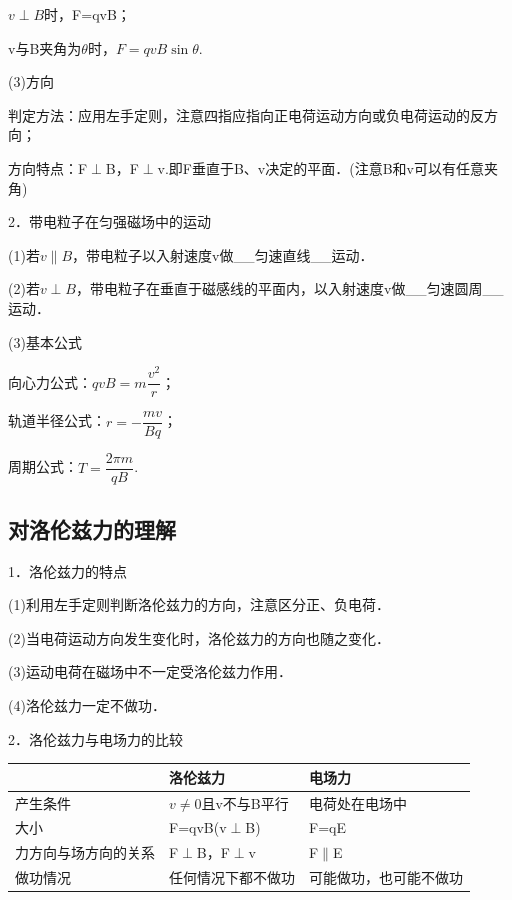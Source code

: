 $v\perp B$时，F=qvB；

v与B夹角为$\theta$时，$F=qvB\sin \theta$.

(3)方向

判定方法：应用左手定则，注意四指应指向正电荷运动方向或负电荷运动的反方向；

方向特点：F$\perp$B，F$\perp$v.即F垂直于B、v决定的平面．(注意B和v可以有任意夹角)

2．带电粒子在匀强磁场中的运动

(1)若$v\parallel B$，带电粒子以入射速度v做\_\_匀速直线\_\_运动．

(2)若$v\perp B$，带电粒子在垂直于磁感线的平面内，以入射速度v做\_\_匀速圆周\_\_运动．

(3)基本公式

向心力公式：$q v B=m \dfrac{v^{2}}{r}$；

轨道半径公式：$r=-\dfrac{m v}{B q}$；

周期公式：$T=\dfrac{2 \pi m}{q B}$.
\newpage
\subsection{对洛伦兹力的理解}

1．洛伦兹力的特点

(1)利用左手定则判断洛伦兹力的方向，注意区分正、负电荷．

(2)当电荷运动方向发生变化时，洛伦兹力的方向也随之变化．

(3)运动电荷在磁场中不一定受洛伦兹力作用．

(4)洛伦兹力一定不做功．

2．洛伦兹力与电场力的比较

\begin{longtable}[]{@{}m{4cm}m{4cm}m{4cm}@{}}
\toprule
& 洛伦兹力 & 电场力\tabularnewline
\midrule
\endhead
产生条件 & $v\neq 0$且v不与B平行 & 电荷处在电场中\tabularnewline
大小 & F=qvB(v$\perp$B) & F=qE\tabularnewline

力方向与场方向的关系
& \begin{minipage}[t]{0.30\columnwidth}\raggedright
F$\perp$B，F$\perp$v\strut
\end{minipage} & \begin{minipage}[t]{0.30\columnwidth}\raggedright
F$\parallel$E\strut
\end{minipage}\tabularnewline
做功情况 & 任何情况下都不做功 & 可能做功，也可能不做功\tabularnewline
\bottomrule
\end{longtable}

